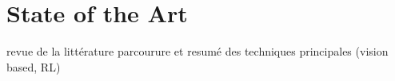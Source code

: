 \chapter{State of the Art}

revue de la littérature parcourure et resumé des techniques principales (vision based, RL)

